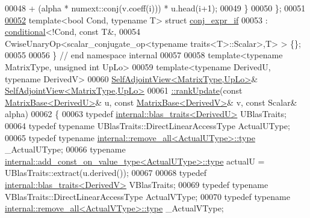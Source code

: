 \begin{DoxyCode}
00048                       + (alpha * numext::conj(v.coeff(i))) * u.head(i+1);
00049   \}
00050 \};
00051 
\hyperlink{struct_eigen_1_1internal_1_1conj__expr__if}{00052} \textcolor{keyword}{template}<\textcolor{keywordtype}{bool} Cond, \textcolor{keyword}{typename} T> \textcolor{keyword}{struct }\hyperlink{struct_eigen_1_1internal_1_1conj__expr__if}{conj\_expr\_if}
00053   : \hyperlink{struct_eigen_1_1internal_1_1conditional}{conditional}<!Cond, const T&,
00054       CwiseUnaryOp<scalar\_conjugate\_op<typename traits<T>::Scalar>,T> > \{\};
00055 
00056 \} \textcolor{comment}{// end namespace internal}
00057 
00058 \textcolor{keyword}{template}<\textcolor{keyword}{typename} MatrixType, \textcolor{keywordtype}{unsigned} \textcolor{keywordtype}{int} UpLo>
00059 \textcolor{keyword}{template}<\textcolor{keyword}{typename} DerivedU, \textcolor{keyword}{typename} DerivedV>
00060 \hyperlink{group___core___module_class_eigen_1_1_self_adjoint_view}{SelfAdjointView<MatrixType,UpLo>}& 
      \hyperlink{group___core___module_a4739585861baa13b25dcce5ed6658311}{SelfAdjointView<MatrixType,UpLo>}
00061 \hyperlink{group___core___module_a4739585861baa13b25dcce5ed6658311}{::rankUpdate}(\textcolor{keyword}{const} \hyperlink{group___core___module_class_eigen_1_1_matrix_base}{MatrixBase<DerivedU>}& u, \textcolor{keyword}{const} 
      \hyperlink{group___core___module_class_eigen_1_1_matrix_base}{MatrixBase<DerivedV>}& v, \textcolor{keyword}{const} Scalar& alpha)
00062 \{
00063   \textcolor{keyword}{typedef} \hyperlink{struct_eigen_1_1internal_1_1blas__traits}{internal::blas\_traits<DerivedU>} UBlasTraits;
00064   \textcolor{keyword}{typedef} \textcolor{keyword}{typename} UBlasTraits::DirectLinearAccessType ActualUType;
00065   \textcolor{keyword}{typedef} \textcolor{keyword}{typename} \hyperlink{group___sparse_core___module}{internal::remove\_all<ActualUType>::type} 
      \_ActualUType;
00066   \textcolor{keyword}{typename} \hyperlink{group___sparse_core___module}{internal::add\_const\_on\_value\_type<ActualUType>::type}
       actualU = UBlasTraits::extract(u.derived());
00067 
00068   \textcolor{keyword}{typedef} \hyperlink{struct_eigen_1_1internal_1_1blas__traits}{internal::blas\_traits<DerivedV>} VBlasTraits;
00069   \textcolor{keyword}{typedef} \textcolor{keyword}{typename} VBlasTraits::DirectLinearAccessType ActualVType;
00070   \textcolor{keyword}{typedef} \textcolor{keyword}{typename} \hyperlink{group___sparse_core___module}{internal::remove\_all<ActualVType>::type} 
      \_ActualVType;

\end{DoxyCode}

